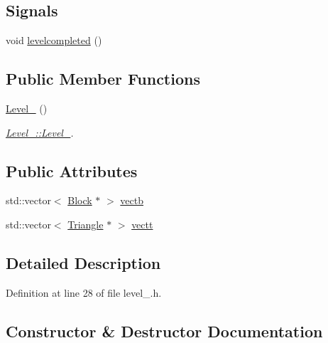 \subsection*{Signals}
\begin{DoxyCompactItemize}
\item 
void \hyperlink{class_level__1_a8910744606161583b969261fa1f0de4a}{levelcompleted} ()
\end{DoxyCompactItemize}
\subsection*{Public Member Functions}
\begin{DoxyCompactItemize}
\item 
\hyperlink{class_level__1_a31b713ea291774e5eac40e1f1ab7faad}{Level\+\_} ()
\begin{DoxyCompactList}\small\item\em \hyperlink{class_level__1_a31b713ea291774e5eac40e1f1ab7faad}{Level\+\_\+::\+Level\+\_}. \end{DoxyCompactList}\end{DoxyCompactItemize}
\subsection*{Public Attributes}
\begin{DoxyCompactItemize}
\item 
std\+::vector$<$ \hyperlink{class_block}{Block} $\ast$ $>$ \hyperlink{class_level__1_a18c333a1770f5ff2d46253a2acce5c25}{vectb}
\item 
std\+::vector$<$ \hyperlink{class_triangle}{Triangle} $\ast$ $>$ \hyperlink{class_level__1_a105889f16d0a0c733256b6f1be02d156}{vectt}
\end{DoxyCompactItemize}


\subsection{Detailed Description}


Definition at line 28 of file level\+\_.\+h.



\subsection{Constructor \& Destructor Documentation}
